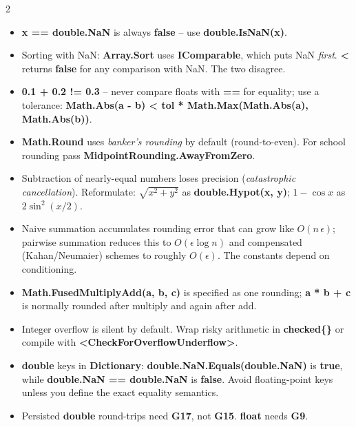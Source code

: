 \documentclass[9pt,a4paper]{extarticle}
\newenvironment{card}[3][acBlue]{%
  \begin{tcolorbox}[
    enhanced, colback=#2, colframe=bdCard,
    coltitle=black, colbacktitle=#2!70!bgHdr,
    fonttitle=\bfseries\fontsize{6.16pt}{7.48pt}\selectfont\MakeUppercase,
    title={#3},
    left=3pt, right=2pt, top=1.4pt, bottom=1.8pt,
    toptitle=1pt, bottomtitle=1pt,
    boxrule=0.4pt,
    borderline west={3pt}{0pt}{#1},
    arc=2pt, before skip=0pt, after skip=1.6mm,
    breakable, toprule at break=0pt, bottomrule at break=0pt,
  ]}{\end{tcolorbox}}
\newcommand{\code}[1]{{\ttfamily\bfseries #1}}
\begin{document}
\begin{multicols}{2}
\begin{card}[acPurple]{bgPurple}{Numerical Correctness Traps}
\begin{itemize}
\item \code{x == double.NaN} is always \code{false} -- use \code{double.IsNaN(x)}.
\item Sorting with NaN: \code{Array.Sort} uses \code{IComparable},
  which puts NaN \emph{first}. \code{<} returns \code{false} for any
  comparison with NaN. The two disagree.
\item \code{0.1 + 0.2 != 0.3} -- never compare floats with \code{==}
  for equality; use a tolerance: \code{Math.Abs(a - b) < tol * Math.Max(Math.Abs(a), Math.Abs(b))}.
\item \code{Math.Round} uses \emph{banker's rounding} by default
  (round-to-even). For school rounding pass
  \code{MidpointRounding.AwayFromZero}.
\item Subtraction of nearly-equal numbers loses precision
  (\emph{catastrophic cancellation}). Reformulate:
  $\sqrt{x^2 + y^2}$ as \code{double.Hypot(x, y)};
  $1 - \cos x$ as $2\sin^2(x/2)$.
\item Naive summation accumulates rounding error that can grow like
  $O(n\,\epsilon)$; pairwise summation reduces this to $O(\epsilon \log n)$
  and compensated (Kahan/Neumaier) schemes to roughly $O(\epsilon)$.
  The constants depend on conditioning.
\item \code{Math.FusedMultiplyAdd(a, b, c)} is specified as one rounding;
  \code{a * b + c} is normally rounded after multiply and again after add.
\item Integer overflow is silent by default. Wrap risky arithmetic
  in \code{checked\{\}} or compile with \code{<CheckForOverflowUnderflow>}.
\item \code{double} keys in \code{Dictionary}: \code{double.NaN.Equals(double.NaN)}
  is \code{true}, while \code{double.NaN == double.NaN} is \code{false}.
  Avoid floating-point keys unless you define the exact equality semantics.
\item Persisted \code{double} round-trips need \code{G17}, not \code{G15}.
  \code{float} needs \code{G9}.
\end{itemize}
\end{card}

\end{multicols}
\end{document}

